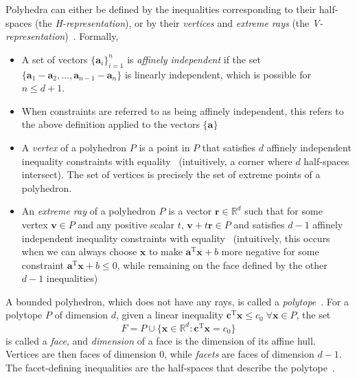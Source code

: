 \documentclass[10pt, a4paper]{article}
\numberwithin{equation}{section} %
\theoremstyle{definition}
\theoremstyle{plain}
\newcommand{\?}{\mathrel{?}} %
\newcommand{\R}{\mathbb{R}} %
\newcommand{\tpose}{\mathrm{T}}
\newcommand{\cvec}[1]{\boldsymbol{\mathbf{#1}}}    %
\newcommand{\rvec}[1]{\boldsymbol{\mathbf{#1}}^\tpose} %
\begin{document}
\begin{appendices}
                          Polyhedra can either be defined by the inequalities corresponding to their half-spaces (the \emph{H-representation}), or by their \emph{vertices} and \emph{extreme rays} (the \emph{V-representation})~\cite[Sec. 2]{LRS}. Formally,
                          \begin{itemize}
                            \item A set of vectors \({\{\cvec{a}_i\}}_{i=1}^n\) is \emph{affinely independent} if the set \(\{\cvec{a}_1-\cvec{a}_2, \ldots, \cvec{a}_{n-1}-\cvec{a}_n\}\) is linearly independent, which is possible for \(n \leq d+1\).
                            \item When constraints are referred to as being affinely independent, this refers to the above definition applied to the vectors \(\{\cvec{a}\}\)
                            \item A \emph{vertex} of a polyhedron \(P\) is a point in \(P\) that satisfies \(d\) affinely independent inequality constraints with equality~\cite[Sec. 2]{LRS} (intuitively, a corner where \(d\) half-spaces intersect). The set of vertices is precisely the set of extreme points of a polyhedron.
                            \item An \emph{extreme ray} of a polyhedron \(P\) is a vector \(\cvec{r}\in\R^d\) such that for some vertex \(\cvec{v}\in{P}\) and any positive scalar \(t\), \(\cvec{v} + t\cvec{r} \in P\) and satisfies \(d-1\) affinely independent inequality constraints with equality~\cite[Sec. 2]{LRS} (intuitively, this occurs when we can always choose \(\cvec{x}\) to make \(\rvec{a}\cvec{x} + b\) more negative for some constraint \(\rvec{a}\cvec{x} + b \leq 0\), while remaining on the face defined by the other \(d-1\) inequalities)
                          \end{itemize}

                          A bounded polyhedron, which does not have any rays, is called a \emph{polytope}~\cite[Ch. 1]{Ziegler}. For a polytope \(P\) of dimension \(d\), given a linear inequality \(\rvec{c}\cvec{x} \leq c_0\;\forall\cvec{x}\in{P}\), the set
                          \begin{equation}
                            F = P \cup \{\cvec{x}\in\R^d : \rvec{c}\cvec{x} = c_0\}
                          \end{equation}
                          is called a \emph{face}, and \emph{dimension} of a face is the dimension of its affine hull. Vertices are then faces of dimension \(0\), while \emph{facets} are faces of dimension \(d-1\). The facet-defining inequalities are the half-spaces that describe the polytope~\cite[Ch. 2]{Ziegler}.


\end{appendices}
\end{document}
